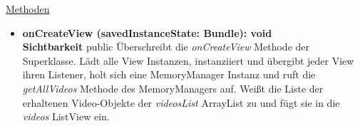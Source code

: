 \underline{Methoden}
\begin{itemize}
\itemsep0pt
\item \textbf{onCreateView (savedInstanceState: Bundle): void}\hfill\\
\textbf{Sichtbarkeit} public\newline
Überschreibt die \textit{onCreateView} Methode der Superklasse. Lädt alle View Instanzen, instanziiert und übergibt jeder View ihren Listener, holt sich eine MemoryManager Instanz und ruft die \textit{getAllVideos} Methode des MemoryManagers auf. Weißt die Liste der erhaltenen Video-Objekte der \textit{videosList} ArrayList zu und fügt sie in die \textit{videos} ListView ein.

\end{itemize}